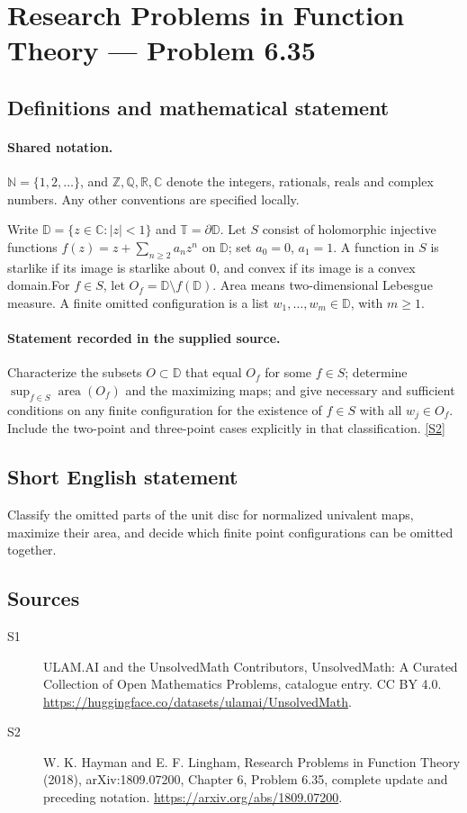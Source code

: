 \documentclass[11pt]{article}
\newcommand{\sref}[2]{\hyperlink{source:#1:#2}{[S#2]}}
\begin{document}
\section{Research Problems in Function Theory — Problem 6.35}\label{statement}

\subsection{Definitions and mathematical statement}

\paragraph{Shared notation.}$\mathbb N=\{1,2,\ldots\}$, and $\mathbb Z,\mathbb Q,\mathbb R,\mathbb C$ denote the integers, rationals, reals and complex numbers. Any other conventions are specified locally.


Write $\mathbb D=\{z\in\mathbb C:|z|<1\}$ and $\mathbb T=\partial\mathbb D$. Let $S$ consist of holomorphic injective functions $f(z)=z+\sum_{n\ge2}a_nz^n$ on $\mathbb D$; set $a_0=0$, $a_1=1$. A function in $S$ is starlike if its image is starlike about $0$, and convex if its image is a convex domain.For $f\in S$, let $O_f=\mathbb D\setminus f(\mathbb D)$. Area means two-dimensional Lebesgue measure. A finite omitted configuration is a list $w_1,\ldots,w_m\in\mathbb D$, with $m\ge1$.
\paragraph{Statement recorded in the supplied source.}
Characterize the subsets $O\subset\mathbb D$ that equal $O_f$ for some $f\in S$; determine $\sup_{f\in S}\operatorname{area}(O_f)$ and the maximizing maps; and give necessary and sufficient conditions on any finite configuration for the existence of $f\in S$ with all $w_j\in O_f$. Include the two-point and three-point cases explicitly in that classification. \sref{statement}{2}
\subsection{Short English statement}
Classify the omitted parts of the unit disc for normalized univalent maps, maximize their area, and decide which finite point configurations can be omitted together.
\subsection{Sources}
\begin{description}
\item[\hypertarget{source:statement:1}{S1}] ULAM.AI and the UnsolvedMath Contributors, UnsolvedMath: A Curated Collection of Open Mathematics Problems, catalogue entry. CC BY 4.0. \url{https://huggingface.co/datasets/ulamai/UnsolvedMath}.
\item[\hypertarget{source:statement:2}{S2}] W. K. Hayman and E. F. Lingham, Research Problems in Function Theory (2018), arXiv:1809.07200, Chapter 6, Problem 6.35, complete update and preceding notation. \url{https://arxiv.org/abs/1809.07200}.
\end{description}
\label{end:statement}
\end{document}
